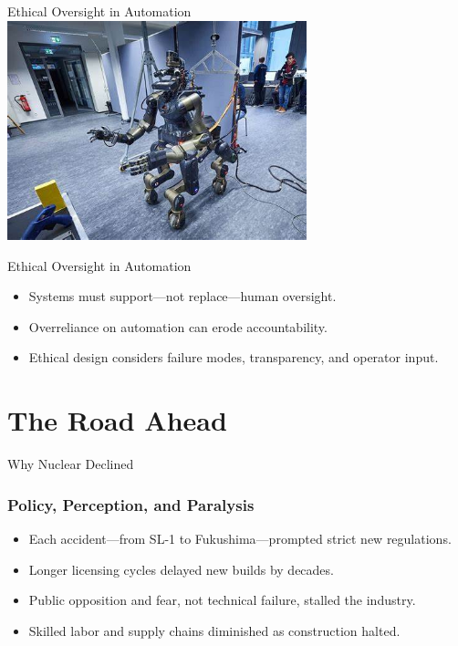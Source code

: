 \documentclass{beamer}
\begin{document}
\begin{frame}{Ethical Oversight in Automation}
  \centering
  \includegraphics[width=0.65\textwidth]{ethicaldesign.jpg}
\end{frame}

\begin{frame}{Ethical Oversight in Automation}
  \begin{itemize}
    \item Systems must support—not replace—human oversight.
    \item Overreliance on automation can erode accountability.
    \item Ethical design considers failure modes, transparency, and operator input.
  \end{itemize}
\end{frame}

\section{The Road Ahead}

\begin{frame}{Why Nuclear Declined}
  \subsubsection*{Policy, Perception, and Paralysis}
  \begin{itemize}
    \item Each accident—from SL-1 to Fukushima—prompted strict new regulations.
    \item Longer licensing cycles delayed new builds by decades.
    \item Public opposition and fear, not technical failure, stalled the industry.
    \item Skilled labor and supply chains diminished as construction halted.
  \end{itemize}
\end{frame}
\end{document}
